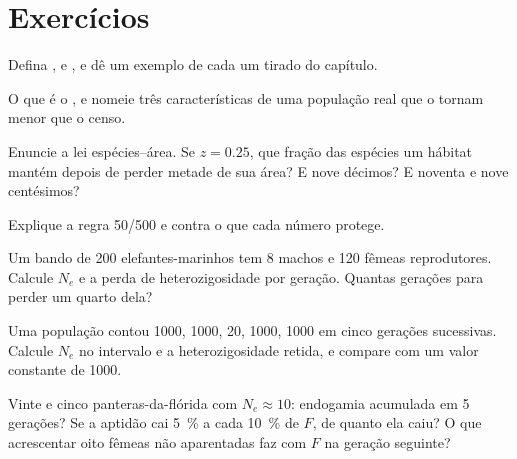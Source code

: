 \section{Exercícios}

\begin{exercise}[$\star$]\label{exo:b3:conservation-biology:1}
Defina ,  e , e dê um exemplo de cada um tirado do capítulo.
\end{exercise}

\begin{exercise}[$\star$]\label{exo:b3:conservation-biology:2}
O que é o , e nomeie três características de
uma população real que o tornam menor que o censo.
\end{exercise}

\begin{exercise}[$\star$]\label{exo:b3:conservation-biology:3}
Enuncie a lei espécies--área. Se $z = 0.25$, que fração das espécies um
hábitat mantém depois de perder metade de sua área? E nove décimos? E
noventa e nove centésimos?
\end{exercise}

\begin{exercise}[$\star$]\label{exo:b3:conservation-biology:4}
Explique a regra 50/500 e contra o que cada número protege.
\end{exercise}

\begin{exercise}[$\star\star$]\label{exo:b3:conservation-biology:5}
Um bando de 200 elefantes-marinhos tem 8 machos e 120 fêmeas
reprodutores. Calcule $N_{e}$ e a perda de heterozigosidade por geração.
Quantas gerações para perder um quarto dela?
\end{exercise}

\begin{exercise}[$\star\star$]\label{exo:b3:conservation-biology:6}
Uma população contou 1000, 1000, 20, 1000, 1000 em cinco gerações
sucessivas. Calcule $N_{e}$ no intervalo e a heterozigosidade retida, e
compare com um valor constante de 1000.
\end{exercise}

\begin{exercise}[$\star\star$]\label{exo:b3:conservation-biology:7}
Vinte e cinco panteras-da-flórida com $N_{e} \approx 10$: endogamia
acumulada em 5 gerações? Se a aptidão cai \qty{5}{\%} a cada \qty{10}{\%}
de $F$, de quanto ela caiu? O que acrescentar oito fêmeas não aparentadas
faz com $F$ na geração seguinte?
\end{exercise}

